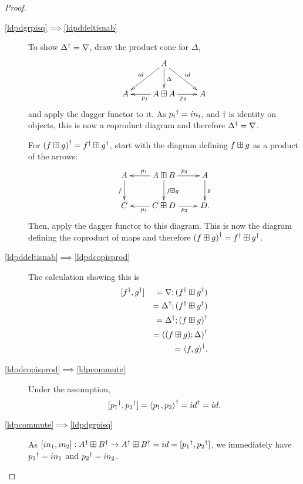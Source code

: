 \begin{proof}
  \begin{description}
    \item[\ref{ldpdgrpisq}$\implies$\ref{ldpddeltisnab}] To show ${\Delta}^{\dagger} = \nabla$,
    draw the product cone for $\Delta$,
    \[
      \xymatrix {
        &A \ar[d]^{\Delta} \ar[dr]^{id} \ar[dl]_{id}\\
        A
         & A\biproduct A \ar[l]^{p_{1}}  \ar[r]_{p_{2}}
         & A
      }
    \]
    and apply the dagger functor to it. As ${p_{i}}^{\dagger} = in_{i}$, and $\dagger$ is identity on
    objects, this is now a coproduct diagram and therefore ${\Delta}^{\dagger} = \nabla$.

    For ${(f\boxplus g)}^{\dagger} = {f}^{\dagger}\boxplus{g}^{\dagger}$, start with the diagram defining
    $f\boxplus g$ as a product of the arrows:
    \[
      \xymatrix{
        A\ar[d]_{f}  & A\biproduct B \ar[l]_{p_{1}} \ar[r]^{p_{2}} \ar[d]^{f\biproduct g}&A \ar[d]^{g}\\
        C & C\biproduct D \ar[l]^{p_{1}} \ar[r]_{p_{2}}  & D.
      }
    \]
    Then, apply the dagger functor to this diagram. This is now the diagram defining the
    coproduct of maps and therefore ${(f\boxplus g)}^{\dagger} = {f}^{\dagger}\boxplus{g}^{\dagger}$.
    \item[\ref{ldpddeltisnab}$\implies$\ref{ldpdcopisprod}] The calculation showing this is
      \begin{eqnarray*}
        &[{f}^{\dagger},{g}^{\dagger}] & = \nabla; ({f}^{\dagger}\boxplus {g}^{\dagger})\\
        & &={\Delta}^{\dagger}; ({f}^{\dagger}\boxplus {g}^{\dagger})\\
        & &={\Delta}^{\dagger}; {(f\boxplus g)}^{\dagger}\\
        & & = {((f\boxplus g);\Delta)}^{\dagger}\\
        & & = {\langle f,g\rangle}^{\dagger}.
      \end{eqnarray*}
    \item[\ref{ldpdcopisprod}$\implies$\ref{ldpcommute}]
      Under the assumption,
      \[
        [{p_{1}}^{\dagger},{p_{2}}^{\dagger}] = {\langle p_{1},p_{2}\rangle}^{\dagger}={id}^{\dagger}=id.
      \]
    \item[\ref{ldpcommute}$\implies$\ref{ldpdgrpisq}] As $[in_{1},in_{2}]:{A}^{\dagger} \boxplus {B}^{\dagger}
      \to {A}^{\dagger} \boxplus {B}^{\dagger} = id = [{p_{1}}^{\dagger},{p_{2}}^{\dagger}]$, we immediately have
      ${p_{1}}^{\dagger} = in_{1}$ and ${p_{2}}^{\dagger} = in_{2}$.
%
  \end{description}
\end{proof}

